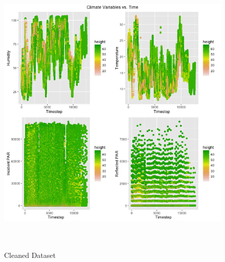 \documentclass[11pt]{article}
\begin{document}
\begin{figure}
  \centering
    \includegraphics[width=\textwidth,height=14cm]{../graphs/figure1.png}
  \caption{Cleaned Dataset}
  \label{fig:fig1}
\end{figure}
\end{document}
